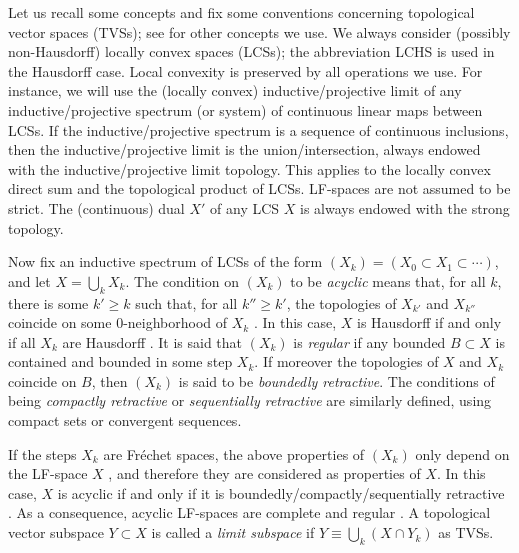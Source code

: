 \documentclass{memo-l}
\theoremstyle{plain}
\theoremstyle{definition}
\theoremstyle{remark}
\numberwithin{section}{chapter}
\numberwithin{equation}{section}%
\begin{document}
Let us recall some concepts and fix some conventions concerning topological vector spaces (TVSs);  see \cite{Edwards1965,Horvath1966-I,Kothe1969-I,Schaefer1971,NariciBeckenstein2011,Wengenroth2003} for other concepts we use. We always consider (possibly non-Hausdorff) locally convex spaces (LCSs);  the abbreviation LCHS  is used in the Hausdorff case. Local convexity is preserved by all operations we use. For instance, we will use the (locally convex) inductive/projective limit of any inductive/projective spectrum (or system) of continuous linear maps between LCSs. If the inductive/projective spectrum is a sequence of continuous inclusions, then the inductive/projective limit is the union/intersection, always endowed with the inductive/projective limit topology. This applies to the locally convex direct sum and the topological product of LCSs. LF-spaces are not assumed to be strict. The (continuous) dual $X'$ of any LCS $X$ is always endowed with the strong topology.

Now fix an inductive spectrum of LCSs of the form $(X_k)=(X_0\subset X_1\subset\cdots)$, and let $X=\bigcup_kX_k$. The condition on $(X_k)$ to be \emph{acyclic}  means that, for all $k$, there is some $k'\ge k$ such that, for all $k''\ge k'$, the topologies of $X_{k'}$ and $X_{k''}$ coincide on some $0$-neighborhood of $X_k$ \cite[Theorem~6.1]{Wengenroth2003}. In this case, $X$ is Hausdorff if and only if all $X_k$ are Hausdorff \cite[Proposition~6.3]{Wengenroth2003}. It is said that $(X_k)$ is \emph{regular}  if any bounded $B\subset X$ is contained and bounded in some step $X_k$. If moreover the topologies of $X$ and $X_k$ coincide on $B$, then $(X_k)$ is said to be \emph{boundedly retractive}. The conditions of being \emph{compactly retractive}  or \emph{sequentially retractive} are similarly defined, using compact sets or convergent sequences. 

If the steps $X_k$ are Fr\'echet spaces, the above properties of $(X_k)$ only depend on the LF-space $X$ \cite[Chapter~6, p.~111]{Wengenroth2003}, and therefore they are considered as properties of $X$. In this case, $X$ is acyclic if and only if it is boundedly/compactly/sequentially retractive \cite[Proposition~6.4]{Wengenroth2003}. As a consequence, acyclic LF-spaces are complete and regular \cite[Corollary~6.5]{Wengenroth2003}. A topological vector subspace $Y\subset X$ is called a \emph{limit subspace}  if $Y\equiv\bigcup_k(X\cap Y_k)$ as TVSs.
\end{document}
